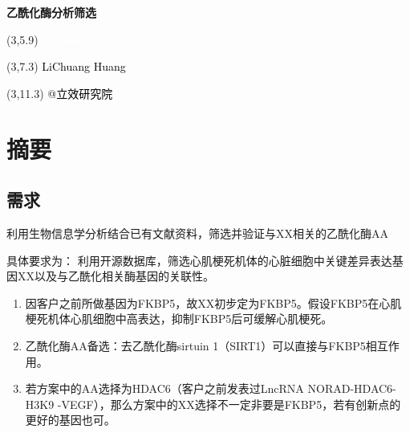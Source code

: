 \documentclass[
]{article}
\author{}
\date{\vspace{-2.5em}}
\providecommand{\tightlist}{%
  \setlength{\itemsep}{0pt}\setlength{\parskip}{0pt}}
\begin{document}
\begin{titlepage} 
\begin{center} \textbf{\Huge 乙酰化酶分析筛选}
\vspace{4em} \begin{textblock}{10}(3,5.9) \huge
\textbf{\textcolor{white}{2024-04-17}}
\end{textblock} \begin{textblock}{10}(3,7.3)
\Large \textcolor{black}{LiChuang Huang}
\end{textblock} \begin{textblock}{10}(3,11.3)
\Large \textcolor{black}{@立效研究院}
\end{textblock} \end{center} \end{titlepage}
\restoregeometry


\tableofcontents

\listoffigures

\listoftables

\newpage


\hypertarget{abstract}{%
\section{摘要}\label{abstract}}

\hypertarget{ux9700ux6c42}{%
\subsection{需求}\label{ux9700ux6c42}}

利用生物信息学分析结合已有文献资料，筛选并验证与XX相关的乙酰化酶AA

具体要求为： 利用开源数据库，筛选心肌梗死机体的心脏细胞中关键差异表达基因XX以及与乙酰化相关酶基因的关联性。

\begin{enumerate}
\def\labelenumi{\arabic{enumi}.}
\tightlist
\item
  因客户之前所做基因为FKBP5，故XX初步定为FKBP5。假设FKBP5在心肌梗死机体心肌细胞中高表达，抑制FKBP5后可缓解心肌梗死。
\item
  乙酰化酶AA备选：去乙酰化酶sirtuin 1（SIRT1）可以直接与FKBP5相互作用。
\item
  若方案中的AA选择为HDAC6（客户之前发表过LncRNA NORAD-HDAC6-H3K9 -VEGF），那么方案中的XX选择不一定非要是FKBP5，若有创新点的更好的基因也可。
\end{enumerate}
\end{document}

